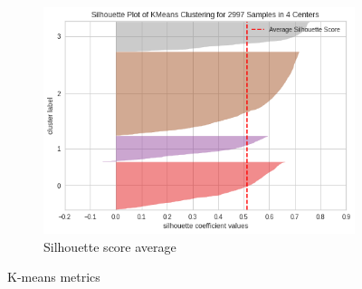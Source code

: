 \begin{figure}[h]
\begin{subfigure}[b]{0.32\textwidth}
		\includegraphics[width=\textwidth]{plots/kmeans/kmeans_silhouette_average}
		\caption{Silhouette score average}
		\label{fig:kmeans_silhouette_average}
  \end{subfigure}
	\caption{K-means metrics}
\end{figure}


